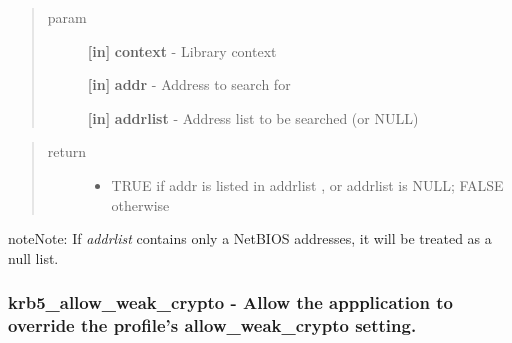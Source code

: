 \documentclass[letterpaper,10pt,english]{sphinxmanual}
\begin{document}
\begin{quote}\begin{description}
\item[{param}] \leavevmode
\textbf{{[}in{]}} \textbf{context} - Library context

\textbf{{[}in{]}} \textbf{addr} - Address to search for

\textbf{{[}in{]}} \textbf{addrlist} - Address list to be searched (or NULL)

\end{description}\end{quote}
\begin{quote}\begin{description}
\item[{return}] \leavevmode\begin{itemize}
\item {} 
TRUE if addr is listed in addrlist , or addrlist is NULL; FALSE otherwise

\end{itemize}

\end{description}\end{quote}

\begin{notice}{note}{Note:}
If \emph{addrlist} contains only a NetBIOS addresses, it will be treated as a null list.
\end{notice}


\subsubsection{krb5\_allow\_weak\_crypto -  Allow the appplication to override the profile's allow\_weak\_crypto setting.}
\label{appdev/refs/api/krb5_allow_weak_crypto::doc}\label{appdev/refs/api/krb5_allow_weak_crypto:krb5-allow-weak-crypto-allow-the-appplication-to-override-the-profile-s-allow-weak-crypto-setting}

\begin{fulllineitems}
\label{appdev/refs/api/krb5_allow_weak_crypto:krb5_allow_weak_crypto}
\end{fulllineitems}
\end{document}
